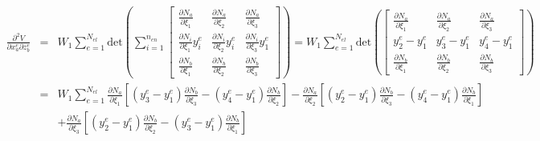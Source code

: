 \documentclass[12pt,aps,pre]{revtex4}
\begin{document}
\begin{eqnarray}
\frac{\partial^2 V}{\partial x_a^e \partial z_b^e} &=&  W_1\sum_{e=1}^{N_{el}} \text{det}\left(\sum_{i=1}^{n_{en}}
%
\begin{bmatrix}
\frac{\partial N_a}{\partial \xi_1}  &  \frac{\partial N_a}{\partial \xi_2} &  \frac{\partial N_a}{\partial \xi_3}\\
%
\frac{\partial N_i}{\partial \xi_1}y_i^e  & \frac{\partial N_i}{\partial \xi_2}y_i^e &\frac{\partial N_i}{\partial \xi_3}y_1^e  \\
%
\frac{\partial N_b}{\partial \xi_1}  & \frac{\partial N_b}{\partial \xi_2} & \frac{\partial N_b}{\partial \xi_3} 
\end{bmatrix}\right) 
%
= W_1\sum_{e=1}^{N_{el}} \text{det}\left(
%
\begin{bmatrix}
\frac{\partial N_a}{\partial \xi_1}  &  \frac{\partial N_a}{\partial \xi_2} &  \frac{\partial N_a}{\partial \xi_3}\\
%
y_2^e - y_1^e & y_3^e - y_1^e & y_4^e - y_1^e \\
%
\frac{\partial N_b}{\partial \xi_1}  & \frac{\partial N_b}{\partial \xi_2} & \frac{\partial N_b}{\partial \xi_3} 
\end{bmatrix}\right) \nonumber\\
&=& W_1\sum_{e=1}^{N_{el}}\frac{\partial N_a}{\partial \xi_1}\left[(y_3^e - y_1^e)\frac{\partial N_b}{\partial \xi_3}-(y_4^e - y_1^e)\frac{\partial N_b}{\partial \xi_2}\right] 
%
-\frac{\partial N_a}{\partial \xi_2}\left[(y_2^e - y_1^e)\frac{\partial N_b}{\partial \xi_3}-(y_4^e - y_1^e)\frac{\partial N_b}{\partial \xi_1}\right] \nonumber\\
%
&&+\frac{\partial N_a}{\partial \xi_3}\left[(y_2^e - y_1^e)\frac{\partial N_b}{\partial \xi_2}-(y_3^e - y_1^e)\frac{\partial N_b}{\partial \xi_1}\right] 
\end{eqnarray}
\end{document}
